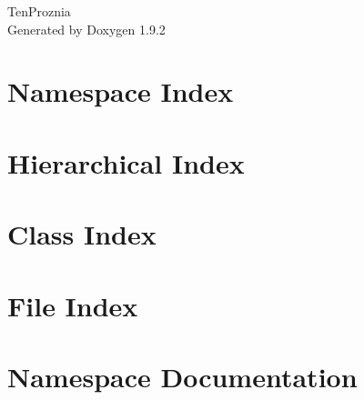 \documentclass[twoside]{book}
\newcommand{\+}{\discretionary{\mbox{\scriptsize$\hookleftarrow$}}{}{}}
\newcommand{\clearemptydoublepage}{%
    \newpage{\pagestyle{empty}\cleardoublepage}%
  }
\begin{document}
  \raggedbottom
    \hypersetup{pageanchor=false,
                bookmarksnumbered=true,
                pdfencoding=unicode
               }
  \begin{titlepage}
  \vspace*{7cm}
  \begin{center}%
  {\Large Ten\+Proznia}\\
  \vspace*{1cm}
  {\large Generated by Doxygen 1.9.2}\\
  \end{center}
  \end{titlepage}
  \clearemptydoublepage
  \tableofcontents
  \clearemptydoublepage
  \hypersetup{pageanchor=true}
\chapter{Namespace Index}

\chapter{Hierarchical Index}

\chapter{Class Index}

\chapter{File Index}

\chapter{Namespace Documentation}




\end{document}
